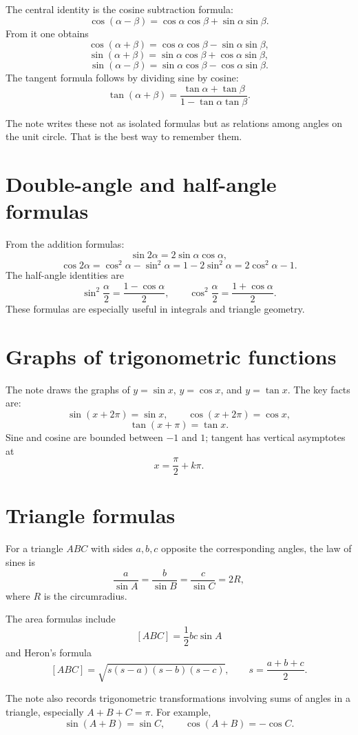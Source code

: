 The central identity is the cosine subtraction formula:
\[
  \cos(\alpha-\beta)
  =\cos\alpha\cos\beta+\sin\alpha\sin\beta.
\]
From it one obtains
\[
  \cos(\alpha+\beta)
  =\cos\alpha\cos\beta-\sin\alpha\sin\beta,
\]
\[
  \sin(\alpha+\beta)
  =\sin\alpha\cos\beta+\cos\alpha\sin\beta,
\]
\[
  \sin(\alpha-\beta)
  =\sin\alpha\cos\beta-\cos\alpha\sin\beta.
\]
The tangent formula follows by dividing sine by cosine:
\[
  \tan(\alpha+\beta)=\frac{\tan\alpha+\tan\beta}{1-\tan\alpha\tan\beta}.
\]

The note writes these not as isolated formulas but as relations among angles on the unit circle.  That is the best way to remember them.

\section{Double-angle and half-angle formulas}

From the addition formulas:
\[
  \sin2\alpha=2\sin\alpha\cos\alpha,
\]
\[
  \cos2\alpha=\cos^2\alpha-\sin^2\alpha
  =1-2\sin^2\alpha
  =2\cos^2\alpha-1.
\]
The half-angle identities are
\[
  \sin^2\frac\alpha2=\frac{1-\cos\alpha}{2},
  \qquad
  \cos^2\frac\alpha2=\frac{1+\cos\alpha}{2}.
\]
These formulas are especially useful in integrals and triangle geometry.

\section{Graphs of trigonometric functions}

The note draws the graphs of \(y=\sin x\), \(y=\cos x\), and \(y=\tan x\).  The key facts are:
\[
  \sin(x+2\pi)=\sin x,\qquad \cos(x+2\pi)=\cos x,
\]
\[
  \tan(x+\pi)=\tan x.
\]
Sine and cosine are bounded between \(-1\) and \(1\); tangent has vertical asymptotes at
\[
  x=\frac\pi2+k\pi.
\]

\section{Triangle formulas}

For a triangle \(ABC\) with sides \(a,b,c\) opposite the corresponding angles, the law of sines is
\[
  \frac a{\sin A}=\frac b{\sin B}=\frac c{\sin C}=2R,
\]
where \(R\) is the circumradius.

The area formulas include
\[
  [ABC]=\frac12bc\sin A
\]
and Heron's formula
\[
  [ABC]=\sqrt{s(s-a)(s-b)(s-c)},\qquad s=\frac{a+b+c}{2}.
\]

The note also records trigonometric transformations involving sums of angles in a triangle, especially \(A+B+C=\pi\).  For example,
\[
  \sin(A+B)=\sin C,\qquad \cos(A+B)=-\cos C.
\]


